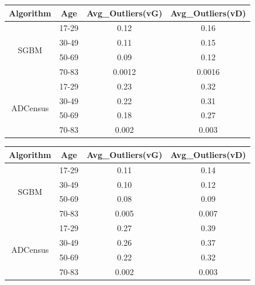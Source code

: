 \begin{minipage}{0.8\linewidth}
\begin{center}
\label{tab:outlmsk}
\begin{tabular}{ |c|c|c|c| }
\hline
Algorithm & Age & Avg\_Outliers(vG) & Avg\_Outliers(vD) \\ \hline
\multirow{4}{*}{SGBM} & 17-29 & 0.12 & 0.16 \\
& 30-49 & 0.11 & 0.15 \\
& 50-69 & 0.09 & 0.12 \\
& 70-83 & 0.0012 & 0.0016 \\ \hline
\multirow{4}{*}{ADCensus} & 17-29 & 0.23 & 0.32 \\
& 30-49 & 0.22 & 0.31 \\
& 50-69 & 0.18 & 0.27 \\
& 70-83 & 0.002 & 0.003 \\ \hline
\end{tabular}
\end{center}
\end{minipage} \newline \newline

\begin{minipage}{0.8\linewidth}
\begin{center}
\label{tab:outlfull}
\begin{tabular}{ |c|c|c|c| }
\hline
Algorithm & Age & Avg\_Outliers(vG) & Avg\_Outliers(vD)  \\ \hline
\multirow{4}{*}{SGBM} & 17-29 & 0.11 & 0.14 \\
& 30-49 & 0.10 & 0.12 \\
& 50-69 & 0.08 & 0.09 \\
& 70-83 & 0.005 & 0.007 \\ \hline
\multirow{4}{*}{ADCensus} & 17-29 & 0.27 & 0.39 \\
& 30-49 & 0.26 & 0.37 \\
& 50-69 & 0.22 & 0.32 \\
& 70-83 & 0.002 & 0.003 \\ \hline
\end{tabular}
\end{center}
\end{minipage} \newline

